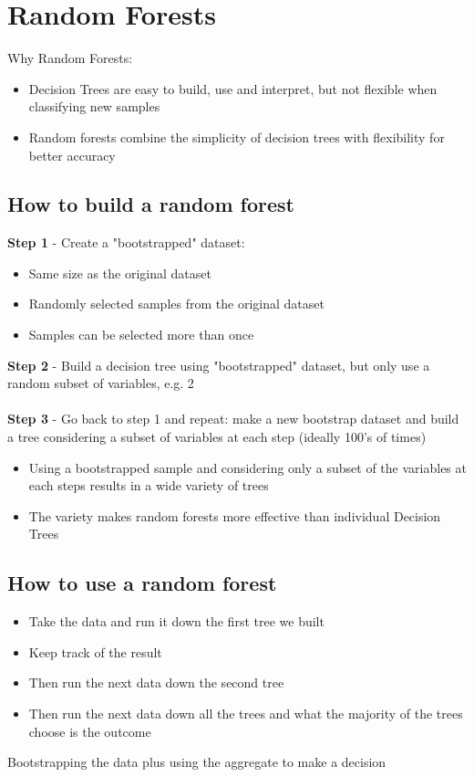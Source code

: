 \documentclass{article}[18pt]
\begin{document}
\section{Random Forests}
Why Random Forests:
\begin{itemize}
	\item Decision Trees are easy to build, use and interpret, but not flexible when classifying new samples
	\item Random forests combine the simplicity of decision trees with flexibility for better accuracy 
\end{itemize}
\subsection{How to build a random forest}
\textbf{Step 1} - Create a "bootstrapped" dataset:
\begin{itemize}
	\item Same size as the original dataset
	\item Randomly selected samples from the original dataset
	\item Samples can be selected more than once
\end{itemize}
\textbf{Step 2} - Build a decision tree using "bootstrapped" dataset, but only use a random subset of variables, e.g. 2\\
\\
\textbf{Step 3} - Go back to step 1 and repeat: make a new bootstrap  dataset and build a tree considering a subset of variables at each step (ideally 100's of times)
\begin{itemize}
	\item Using a bootstrapped sample and considering only a subset of the variables at each steps results in a wide variety of trees
	\item The variety makes random forests more effective than individual Decision Trees
\end{itemize}
\subsection{How to use a random forest}
\begin{itemize}
	\item Take the data and run it down the first tree we built
	\item Keep track of the result
	\item Then run the next data down the second tree
	\item Then run the next data down all the trees and what the majority of the trees choose is the outcome
\end{itemize}
\begin{definition}[Bagging]
	Bootstrapping the data plus using the aggregate to make a decision
\end{definition}
\end{document}
